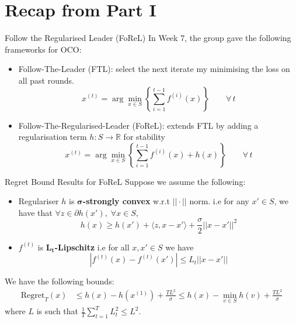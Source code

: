 \documentclass{beamer}
\begin{document}
\section{Recap from Part I}
\begin{frame}{Follow the Regularised Leader (FoReL)}
In Week 7, the group gave the following frameworks for OCO:\pause
\begin{itemize}
    \item Follow-The-Leader (FTL): 
    select the next iterate my minimising the loss on all past rounds.
    \begin{equation}
         x^{(t)} = \arg \min_{x \in S} \left\{\sum_{i = 1}^{t-1} f^{(i)}(x)\right\}\qquad\forall\,t
    \end{equation}\pause
    \item Follow-The-Regularised-Leader (FoReL):
    extends FTL by adding a regularisation term $h: S \to \mathbb R$ for stability
    \begin{equation}
        x^{(t)} = \arg \min_{x \in S} \left\{\sum_{i = 1}^{t-1} f^{(i)}(x) + h(x)\right\}\qquad\forall\,t
    \end{equation}
\end{itemize}
\end{frame}

\begin{frame}{Regret Bound Results for FoReL}
Suppose we assume the following:
\begin{itemize}
    \item Regulariser $h$ is $\boldsymbol{\sigma}$\textbf{-strongly convex} w.r.t $||\cdot||$ norm.
    i.e for any $x' \in S$, we have that $\forall z \in \partial h(x'),\;\forall x \in S,$\begin{equation*}
         h(x) \geq h(x') + \langle z, x - x' \rangle + \frac{\sigma}{2} || x - x' ||^2
    \end{equation*}
\pause
    \item $f^{(t)}$ is $\mathbf{L_t}$\textbf{-Lipschitz} i.e for all $x, x' \in S$ we have $$|f^{(t)}(x) - f^{(t)}(x')| \leq L_t||x-x'||$$
\end{itemize}
We have the following bounds:
        \begin{equation}\label{eqn:forel_regre_with_min}
        \begin{aligned}
    \text{Regret}_T(x) &\leq h(x) - h(x^{(1)}) + \frac{TL^2}{\sigma} \leq h(x) - \min_{v \in S} h(v) + \frac{TL^2}{\sigma}
    \end{aligned}
\end{equation} 
where $L$ is such that $\frac{1}{T}\sum_{t=1}^T L_t^2 \leq L^2$.
\end{frame}
\end{document}
